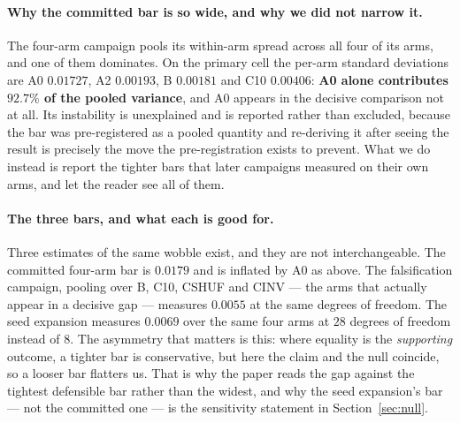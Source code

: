 \documentclass{article}
\begin{document}
\paragraph{Why the committed bar is so wide, and why we did not narrow it.} The four-arm campaign
pools its within-arm spread across all four of its arms, and one of them dominates. On the primary
cell the per-arm standard deviations are A0 $0.01727$, A2 $0.00193$, B $0.00181$ and C10 $0.00406$:
\textbf{A0 alone contributes $92.7\%$ of the pooled variance}, and A0 appears in the decisive
comparison not at all. Its instability is unexplained and is reported rather than excluded, because
the bar was pre-registered as a pooled quantity and re-deriving it after seeing the result is
precisely the move the pre-registration exists to prevent. What we do instead is report the tighter
bars that later campaigns measured on their own arms, and let the reader see all of them.

\paragraph{The three bars, and what each is good for.} Three estimates of the same wobble exist,
and they are not interchangeable. The committed four-arm bar is $0.0179$ and is inflated by A0 as
above. The falsification campaign, pooling over B, C10, CSHUF and CINV --- the arms that actually
appear in a decisive gap --- measures $0.0055$ at the same degrees of freedom. The seed expansion
measures $0.0069$ over the same four arms at $28$ degrees of freedom instead of $8$. The asymmetry
that matters is this: where equality is the \emph{supporting} outcome, a tighter bar is
conservative, but here the claim and the null coincide, so a looser bar flatters us. That is why the
paper reads the gap against the tightest defensible bar rather than the widest, and why the seed
expansion's bar --- not the committed one --- is the sensitivity statement in Section~\ref{sec:null}.
\end{document}
